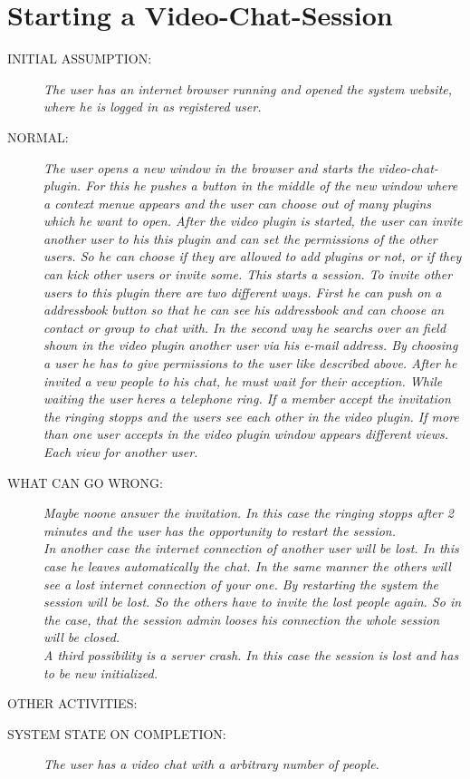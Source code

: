 \section{Starting a Video-Chat-Session}
\begin{description}
  \item [INITIAL ASSUMPTION:]
    \textit{The user has an internet browser running and
opened the system website, where he is logged in as registered user.}
  \item [NORMAL:]
    \textit{The user opens a new window in the browser and starts the video-chat-plugin. For this he pushes a button in the middle of the new window where a context menue appears and the user can choose out of many plugins which he want to open. After the video plugin is started, the user can invite another user to his this plugin and can set the permissions of the other users. So he can choose if they are allowed to add plugins or not, or if they can kick other users or invite some. This starts a session. To invite other users to this plugin there are two different ways. First he can push on a addressbook button so that he can see his addressbook and can choose an contact or group to chat with. In the second way he searchs over an field shown in the video plugin another user via his e-mail address. By choosing a user he has to give permissions to the user like described above. After he invited a vew people to his chat, he must wait for their acception. While waiting the user heres a telephone ring. If a member accept the invitation the ringing stopps and the users see each other in the video plugin. If more than one user accepts in the video plugin window appears different views. Each view for another user.}
  \item [WHAT CAN GO WRONG:]
    \textit{Maybe noone answer the invitation. In this case the ringing stopps after 2 minutes and the user has the opportunity to restart the session.\\
		In another case the internet connection of another user will be lost. In this case he leaves automatically the chat. In the same manner the others will see a lost internet connection of your one. By restarting the system the session will be lost. So the others have to invite the lost people again. So in the case, that the session admin looses his connection the whole session will be closed.\\
		A third possibility is a server crash. In this case the session is lost and has to be new initialized.
}
  \item [OTHER ACTIVITIES:]
    \textit{}
  \item [SYSTEM STATE ON COMPLETION:]
    \textit{The user has a video chat with a arbitrary number of people.}
\end{description}

